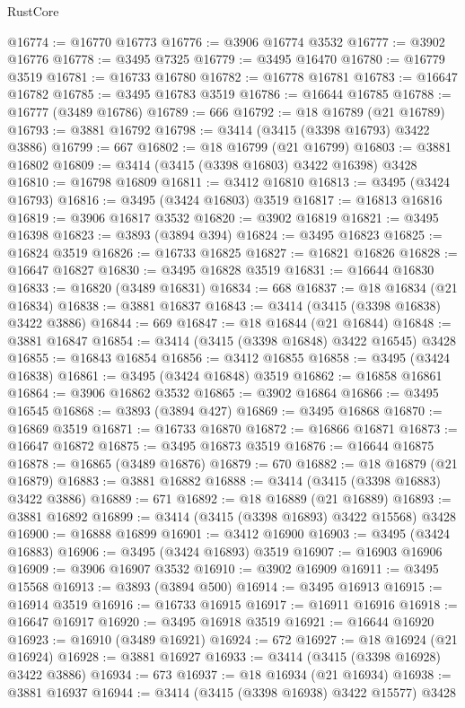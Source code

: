 \begin{lexlean}{RustCore}
\begin{coremodule}
@16774 := @16770 @16773
@16776 := @3906 @16774 @3532
@16777 := @3902 @16776
@16778 := @3495 @7325
@16779 := @3495 @16470
@16780 := @16779 @3519
@16781 := @16733 @16780
@16782 := @16778 @16781
@16783 := @16647 @16782
@16785 := @3495 @16783 @3519
@16786 := @16644 @16785
@16788 := @16777 (@3489 @16786)
@16789 := 666
@16792 := @18 @16789 (@21 @16789)
@16793 := @3881 @16792
@16798 := @3414 (@3415 (@3398 @16793) @3422 @3886)
@16799 := 667
@16802 := @18 @16799 (@21 @16799)
@16803 := @3881 @16802
@16809 := @3414 (@3415 (@3398 @16803) @3422 @16398) @3428
@16810 := @16798 @16809
@16811 := @3412 @16810
@16813 := @3495 (@3424 @16793)
@16816 := @3495 (@3424 @16803) @3519
@16817 := @16813 @16816
@16819 := @3906 @16817 @3532
@16820 := @3902 @16819
@16821 := @3495 @16398
@16823 := @3893 (@3894 @394)
@16824 := @3495 @16823
@16825 := @16824 @3519
@16826 := @16733 @16825
@16827 := @16821 @16826
@16828 := @16647 @16827
@16830 := @3495 @16828 @3519
@16831 := @16644 @16830
@16833 := @16820 (@3489 @16831)
@16834 := 668
@16837 := @18 @16834 (@21 @16834)
@16838 := @3881 @16837
@16843 := @3414 (@3415 (@3398 @16838) @3422 @3886)
@16844 := 669
@16847 := @18 @16844 (@21 @16844)
@16848 := @3881 @16847
@16854 := @3414 (@3415 (@3398 @16848) @3422 @16545) @3428
@16855 := @16843 @16854
@16856 := @3412 @16855
@16858 := @3495 (@3424 @16838)
@16861 := @3495 (@3424 @16848) @3519
@16862 := @16858 @16861
@16864 := @3906 @16862 @3532
@16865 := @3902 @16864
@16866 := @3495 @16545
@16868 := @3893 (@3894 @427)
@16869 := @3495 @16868
@16870 := @16869 @3519
@16871 := @16733 @16870
@16872 := @16866 @16871
@16873 := @16647 @16872
@16875 := @3495 @16873 @3519
@16876 := @16644 @16875
@16878 := @16865 (@3489 @16876)
@16879 := 670
@16882 := @18 @16879 (@21 @16879)
@16883 := @3881 @16882
@16888 := @3414 (@3415 (@3398 @16883) @3422 @3886)
@16889 := 671
@16892 := @18 @16889 (@21 @16889)
@16893 := @3881 @16892
@16899 := @3414 (@3415 (@3398 @16893) @3422 @15568) @3428
@16900 := @16888 @16899
@16901 := @3412 @16900
@16903 := @3495 (@3424 @16883)
@16906 := @3495 (@3424 @16893) @3519
@16907 := @16903 @16906
@16909 := @3906 @16907 @3532
@16910 := @3902 @16909
@16911 := @3495 @15568
@16913 := @3893 (@3894 @500)
@16914 := @3495 @16913
@16915 := @16914 @3519
@16916 := @16733 @16915
@16917 := @16911 @16916
@16918 := @16647 @16917
@16920 := @3495 @16918 @3519
@16921 := @16644 @16920
@16923 := @16910 (@3489 @16921)
@16924 := 672
@16927 := @18 @16924 (@21 @16924)
@16928 := @3881 @16927
@16933 := @3414 (@3415 (@3398 @16928) @3422 @3886)
@16934 := 673
@16937 := @18 @16934 (@21 @16934)
@16938 := @3881 @16937
@16944 := @3414 (@3415 (@3398 @16938) @3422 @15577) @3428

\end{coremodule}
\end{lexlean}
